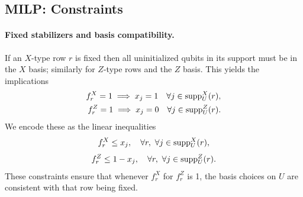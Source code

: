 \subsection{MILP: Constraints}

\paragraph{Fixed stabilizers and basis compatibility.}
If an $X$-type row $r$ is fixed then all uninitialized qubits in its support must be in the $X$ basis; similarly for $Z$-type rows and the $Z$ basis. This yields the implications
\begin{equation}
  \begin{aligned}
    f_r^X = 1 \;\Longrightarrow\; x_j = 1 \quad \forall j \in \mathrm{supp}^X_U(r), \\
    f_r^Z = 1 \;\Longrightarrow\; x_j = 0 \quad \forall j \in \mathrm{supp}^Z_U(r).
  \end{aligned}
\end{equation}
We encode these as the linear inequalities
\begin{equation}
  f_r^X \le x_j,
  \quad
  \forall r,\ \forall j \in \mathrm{supp}^X_U(r),
  \label{eq:fixed-X}
\end{equation}
\begin{equation}
  f_r^Z \le 1 - x_j,
  \quad
  \forall r,\ \forall j \in \mathrm{supp}^Z_U(r).
  \label{eq:fixed-Z}
\end{equation}
These constraints ensure that whenever $f_r^{X}$ for $ f_r^Z $ is 1, the basis choices on $U$ are consistent with that row being fixed.


